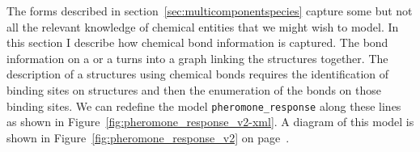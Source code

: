 \documentclass{cekarticle}
\begin{document}
The forms described in section~\ref{sec:multicomponentspecies} capture some but not all
the relevant knowledge of chemical entities that we might wish to model.  In this section I
describe how chemical bond information is captured.
The bond information on a  or a  turns into a
graph linking the  structures together.
The description of a structures using chemical
bonds requires the identification of binding sites on  structures and
then the enumeration of the bonds on those binding sites.  We can redefine the model
\texttt{pheromone\_response} along these lines as shown in Figure~\ref{fig:pheromone_response_v2-xml}.
A diagram of this model is shown in Figure~\ref{fig:pheromone_response_v2} on
page~\pageref{fig:pheromone_response_v2}.
\end{document}
